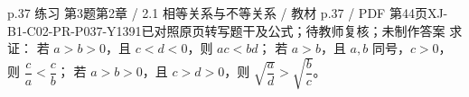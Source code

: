 \par\noindent\begin{minipage}{\linewidth}
\begin{bankitem}{p.37 练习 第3题}{第2章 / 2.1 相等关系与不等关系 / 教材 p.37 / PDF 第44页}{XJ-B1-C02-PR-P037-Y1391}{已对照原页转写题干及公式；待教师复核；未制作答案}
求证：
若 $a>b>0$，且 $c<d<0$，则 $ac<bd$；
若 $a>b$，且 $a,b$ 同号，$c>0$，则 $\dfrac ca<\dfrac cb$；
若 $a>b>0$，且 $c>d>0$，则 $\sqrt{\dfrac ad}>\sqrt{\dfrac bc}$。
\end{bankitem}
\end{minipage}\par\medskip
